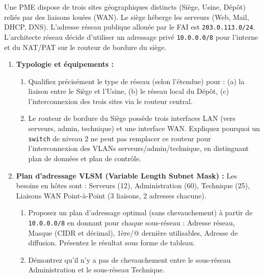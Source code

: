 \documentclass[11pt]{article}
\begin{document}
\begin{exercice}
Une PME dispose de trois sites géographiques distincts (Siège, Usine, Dépôt) reliés par des liaisons louées (WAN). Le siège héberge les serveurs (Web, Mail, DHCP, DNS). L'adresse réseau publique allouée par le FAI est \texttt{203.0.113.0/24}. L'architecte réseau décide d'utiliser un adressage privé \texttt{10.0.0.0/8} pour l'interne et du NAT/PAT sur le routeur de bordure du siège.

\begin{enumerate}
    \item \textbf{Typologie et équipements :} 
    \begin{enumerate}
        \item Qualifiez précisément le type de réseau (selon l'étendue) pour : (a) la liaison entre le Siège et l'Usine, (b) le réseau local du Dépôt, (c) l'interconnexion des trois sites via le routeur central.
        \item Le routeur de bordure du Siège possède trois interfaces LAN (vers serveurs, admin, technique) et une interface WAN. Expliquez pourquoi un \texttt{switch} de niveau 2 ne peut pas remplacer ce routeur pour l'interconnexion des VLANs serveurs/admin/technique, en distinguant plan de données et plan de contrôle.
    \end{enumerate}
    
    \item \textbf{Plan d'adressage VLSM (Variable Length Subnet Mask) :} 
    Les besoins en hôtes sont : Serveurs (12), Administration (60), Technique (25), Liaisons WAN Point-à-Point (3 liaisons, 2 adresses chacune). 
    \begin{enumerate}
        \item Proposez un plan d'adressage optimal (sans chevauchement) à partir de \texttt{10.0.0.0/8} en donnant pour chaque sous-réseau : Adresse réseau, Masque (CIDR et décimal), 1ère/@ dernière utilisables, Adresse de diffusion. Présentez le résultat sous forme de tableau.
        \item Démontrez qu'il n'y a pas de chevauchement entre le sous-réseau Administration et le sous-réseau Technique.
    \end{enumerate}


\end{enumerate}
\end{exercice}
\end{document}
